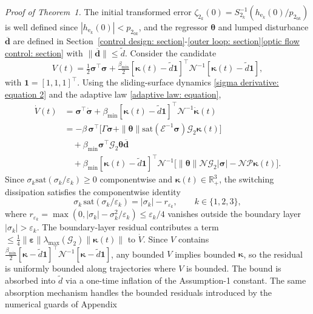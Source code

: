 \documentclass{IEEEtaes}
\begin{document}
\textit{Proof of Theorem~1.} The initial transformed error $\zeta_{2_k}(0) = S_{2_k}^{-1}(h_{\text{e}_k}(0)/p_{2_{0k}})$ is well defined since $|h_{\text{e}_k}(0)|<p_{2_{0k}}$, and the regressor $\boldsymbol{\theta}$ and lumped disturbance $\boldsymbol{\overline{d}}$ are defined in Section~\ref{control design: section}-\ref{outer loop: section}\ref{optic flow control: section} with $\|\boldsymbol{\overline{d}}\|\le\tilde{d}$. Consider the candidate
\begin{equation} \label{V candidate: equation}
    V(t) = \tfrac12\boldsymbol{\sigma}^\top\boldsymbol{\sigma} + \tfrac{\beta_{\min}}{2}[\boldsymbol{\kappa}(t)-\tilde{d}\boldsymbol{1}]^\top\mathcal{N}^{-1}[\boldsymbol{\kappa}(t)-\tilde{d}\boldsymbol{1}],
\end{equation}
with $\boldsymbol{1}=[1,1,1]^\top$. Using the sliding-surface dynamics \eqref{sigma derivative: equation 2} and the adaptive law \eqref{adaptive law: equation},
\begin{align*}
\dot{V}(t) &= \boldsymbol{\sigma}^\top\dot{\boldsymbol{\sigma}} + \beta_{\min}[\boldsymbol{\kappa}(t)-\tilde{d}\boldsymbol{1}]^\top\mathcal{N}^{-1}\dot{\boldsymbol{\kappa}}(t)\\
&= -\beta\,\boldsymbol{\sigma}^\top\!\big[\Gamma\boldsymbol{\sigma}+\|\boldsymbol{\theta}\|\text{sat}(\mathcal{E}^{-1}\boldsymbol{\sigma})\mathcal{G}_2\boldsymbol{\kappa}(t)\big]\\
&\quad + \beta_{\min}\boldsymbol{\sigma}^\top\mathcal{G}_2\boldsymbol{\theta}\boldsymbol{\overline{d}}\\
&\quad + \beta_{\min}[\boldsymbol{\kappa}(t)-\tilde{d}\boldsymbol{1}]^\top\mathcal{N}^{-1}\!\big[\|\boldsymbol{\theta}\|\mathcal{N}\mathcal{G}_2|\boldsymbol{\sigma}| - \mathcal{N}\mathcal{P}\boldsymbol{\kappa}(t)\big].
\end{align*}
Since $\sigma_k\text{sat}(\sigma_k/\varepsilon_k)\ge 0$ componentwise and $\boldsymbol{\kappa}(t)\in\mathbb{R}_+^3$, the switching dissipation satisfies the componentwise identity
\begin{equation*}
\sigma_k\,\text{sat}(\sigma_k/\varepsilon_k) = |\sigma_k| - r_{\varepsilon_k},\qquad k\in\{1,2,3\},
\end{equation*}
where $r_{\varepsilon_k} = \max(0,|\sigma_k|-\sigma_k^2/\varepsilon_k)\le\varepsilon_k/4$ vanishes outside the boundary layer $|\sigma_k|>\varepsilon_k$. The boundary-layer residual contributes a term $\le\tfrac14\|\boldsymbol{\varepsilon}\|\lambda_{\max}(\mathcal{G}_2)\|\boldsymbol{\kappa}(t)\|$ to $\dot V$. Since $V$ contains $\tfrac{\beta_{\min}}{2}[\boldsymbol{\kappa}-\tilde d\boldsymbol{1}]^\top\mathcal{N}^{-1}[\boldsymbol{\kappa}-\tilde d\boldsymbol{1}]$, any bounded $V$ implies bounded $\boldsymbol{\kappa}$, so the residual is uniformly bounded along trajectories where $V$ is bounded. The bound is absorbed into $\tilde{d}$ via a one-time inflation of the Assumption-1 constant. The same absorption mechanism handles the bounded residuals introduced by the numerical guards of Appendix~
\end{document}
